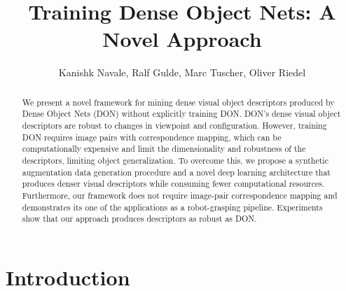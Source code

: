 \documentclass[english]{article}
\title{Training Dense Object Nets: A Novel Approach}
\author{%
  Kanishk Navale, Ralf Gulde, Marc Tuscher, Oliver Riedel
}
\begin{document}
\maketitle

\begin{abstract}
  We present a novel framework for mining dense visual object descriptors produced by Dense Object Nets (DON) without 
  explicitly training DON. DON's dense visual object descriptors are robust to changes in viewpoint and configuration.
  However, training DON requires image pairs with correspondence mapping, which can be computationally expensive and 
  limit the dimensionality and robustness of the descriptors, limiting object generalization. 
  To overcome this, we propose a synthetic augmentation data generation procedure and a novel deep 
  learning architecture that produces denser visual descriptors while consuming fewer computational resources. 
  Furthermore, our framework does not require image-pair correspondence mapping and demonstrates its one of the applications 
  as a robot-grasping pipeline. Experiments show that our approach produces descriptors as robust as DON.
\end{abstract}

\section{Introduction}


{\small \printbibliography}
\end{document}
